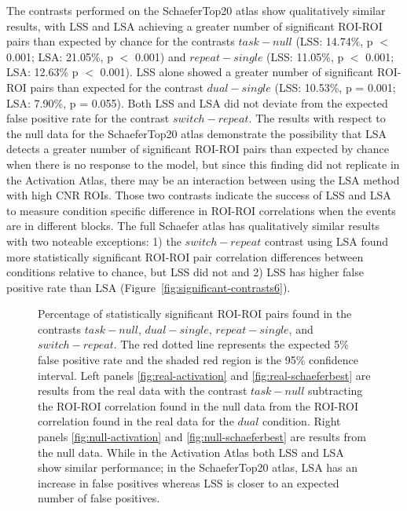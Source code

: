 \documentclass[phd,appendix,figures]{uithesis}
\begin{document}
The contrasts performed on the SchaeferTop20 atlas show qualitatively similar results,
with LSS and LSA achieving a greater number of significant ROI-ROI pairs
than expected by chance for the contrasts
$task - null$ (LSS: 14.74\%, p $<$ 0.001; LSA: 21.05\%, p $<$ 0.001) and
$repeat - single$ (LSS: 11.05\%, p $<$ 0.001; LSA: 12.63\% p $<$ 0.001).
LSS alone showed a greater number of significant ROI-ROI pairs than expected
for the contrast
$dual - single$ (LSS: 10.53\%, p = 0.001; LSA: 7.90\%, p = 0.055).
Both LSS and LSA did not deviate from the expected false positive rate for the contrast
$switch - repeat$.
The results with respect to the null data for the SchaeferTop20 atlas demonstrate
the possibility that LSA detects a greater number of significant ROI-ROI
pairs than expected by chance when there is no response to the model, but since this finding did not
replicate in the Activation Atlas, there may be an interaction between using the LSA method with
high CNR ROIs.
Those two contrasts indicate the success of LSS and LSA to measure
condition specific difference in ROI-ROI correlations when the events are in different blocks.
The full Schaefer atlas has qualitatively similar results with two noteable exceptions:
1) the $switch - repeat$ contrast using LSA found more statistically significant
ROI-ROI pair correlation differences between conditions relative to chance,
but LSS did not and
2) LSS has higher false positive rate than LSA (Figure~\ref{fig:significant-contrasts6}).

\begin{figure}[H]
  \centering
  \hfill
  \vfill
  \hfill
  \caption[Comparison of LSS/LSA in participant data]{
    Percentage of statistically significant ROI-ROI pairs found
    in the contrasts $task - null$, $dual - single$, $repeat - single$, and
    $switch - repeat$.
    The red dotted line represents the expected 5\% false positive rate
    and the shaded red region is the 95\% confidence interval.
    Left panels \ref{fig:real-activation} and \ref{fig:real-schaeferbest}
    are results from the real data with the contrast $task - null$ subtracting the
    ROI-ROI correlation found in the null data from the ROI-ROI correlation found in the
    real data for the $dual$ condition.
    Right panels \ref{fig:null-activation} and \ref{fig:null-schaeferbest} are results
    from the null data.
    While in the Activation Atlas both LSS and LSA show similar performance;
    in the SchaeferTop20 atlas, LSA has an increase in false positives
    whereas LSS is closer to an expected number of false positives.
  }
\label{fig:main-result}
\end{figure}
\end{document}
